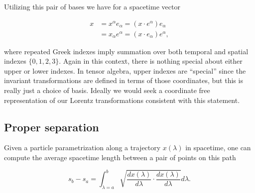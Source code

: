 \documentclass[iop,tighten]{emulateapj}
\begin{document}
Utilizing this pair of bases we have for a spacetime vector

\begin{equation}\label{eqn:grahamSchmidtLorentz:331}
\begin{aligned}
x &= x^\alpha e_\alpha = (x \cdot e^\alpha) e_\alpha \\
  &= x_\alpha e^\alpha = (x \cdot e_\alpha) e^\alpha,
\end{aligned}
\end{equation}

where repeated Greek indexes imply summation over both temporal and spatial indexes $\{0, 1, 2, 3\}$.  Again in this context, there is nothing special about either upper or lower indexes.  In tensor algebra, upper indexes are ``special'' since the invariant transformations are defined in terms of those coordinates, but this is really just a choice of basis.  Ideally we would seek a coordinate free representation of our Lorentz transformations consistent with this statement.

\subsection{Proper separation}

Given a particle parametrization along a trajectory $x(\lambda)$ in spacetime, one can compute the average spacetime length between a pair of points on this path

\begin{equation}\label{eqn:grahamSchmidtLorentz:400}
s_b - s_a = \int_{\lambda = a}^b \sqrt{ \frac{d x(\lambda)}{d\lambda} \cdot \frac{d x(\lambda)}{d\lambda} } d\lambda.
\end{equation}

%
%
%
\end{document}
